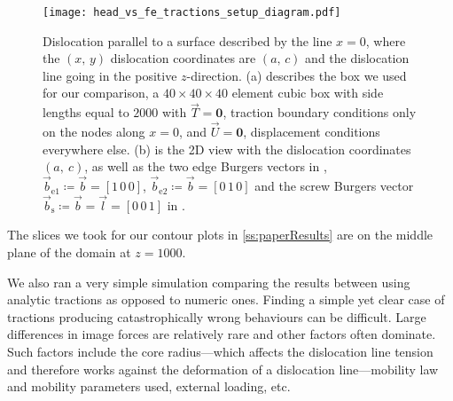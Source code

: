 \begin{figure}
  \centering
  \texttt{[image: head\_vs\_fe\_tractions\_setup\_diagram.pdf]}
  \caption[Set up comparing infinite-domain, singular solutions of stress fields to those obtained via a non-singular formulation with analytic and numeric tractions coupled to FEM.]{Dislocation parallel to a surface described by the line $x = 0$, where the $(x,\,y)$ dislocation coordinates are $(a,\,c)$ and the dislocation line going in the positive $z$-direction. (a) describes the box we used for our comparison, a  $40 \times 40 \times 40$ element cubic box with side lengths equal to $2000$ with $\vec{T} = \bm{0}$, traction boundary conditions only on the nodes along $x = 0$, and $\vec{U} = \bm{0}$, displacement conditions everywhere else. (b) is the 2D view with the dislocation coordinates $(a,~c)$, as well as the two edge Burgers vectors in \cite{head1953edge}, $\vec{b}_\textrm{e1} \coloneqq \vec{b} = [1\, 0\, 0]$, $\vec{b}_\textrm{e2} \coloneqq \vec{b} = [0\, 1\, 0]$ and the screw Burgers vector $\vec{b}_\textrm{s} \coloneqq \vec{b} = \vec{l} = [0\, 0\, 1] $ in \cite[p.~59,~64]{hirth1983theory}.}
  \label{f:headvstractionfem}
\end{figure}

The slices we took for our contour plots in \cref{ss:paperResults} are on the middle plane of the domain at $z = 1000$.

We also ran a very simple simulation comparing the results between using analytic tractions as opposed to numeric ones. Finding a simple yet clear case of tractions producing catastrophically wrong behaviours can be difficult. Large differences in image forces are relatively rare and other factors often dominate. Such factors include the core radius---which affects the dislocation line tension and therefore works against the deformation of a dislocation line---mobility law and mobility parameters used, external loading, etc.

